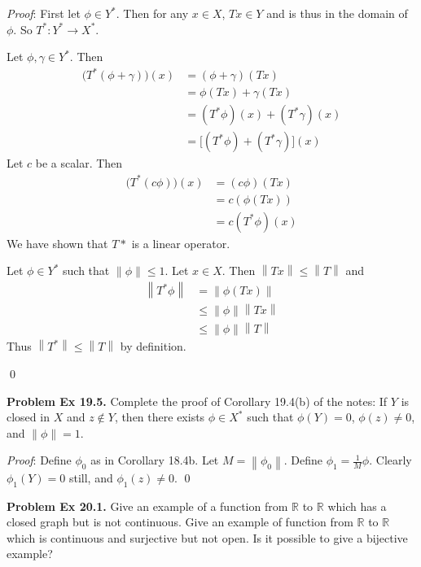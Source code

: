 \documentclass[12pt]{article}
\newcommand{\problem}[1]{\hspace{-4 ex} \large \textbf{Problem #1} }
\newcommand{\norm}[1]{\left\lVert#1\right\rVert}
\renewenvironment{proof}{\hspace{-4 ex} \emph{Proof}:}{\qed}
\newcommand{\RR}{\mathbb{R}}
\begin{document}
	\begin{proof}
		First let $\phi \in Y^*$. Then for any $x \in X$, $Tx \in Y$ and is thus in the domain of $\phi$. So $T^*: Y^* \to X^*$. \bigbreak
		
		Let $\phi, \gamma \in Y^*$. Then 
		\begin{align*}
			\big(T^*(\phi + \gamma) \big)(x) & = (\phi + \gamma)(Tx) \\
			& = \phi(Tx) + \gamma(Tx) \\
			& = (T^*\phi)(x) + (T^*\gamma)(x) \\
			& = \big[(T^*\phi)+ (T^*\gamma)\big](x)
		\end{align*}
		Let $c$ be a scalar. Then
		\begin{align*}
			\big( T^*(c\phi) \big)(x) &= (c\phi)(Tx) \\
			& = c (\phi(Tx)) \\
			& = c(T^* \phi)(x)
		\end{align*}
		We have shown that $T*$ is a linear operator. \bigbreak
		
		Let $\phi \in Y^*$ such that $\norm{\phi} \leq 1$. Let $x \in X$. Then $\norm{Tx} \leq \norm{T}$ and
		\begin{align*}
			\norm{T^* \phi} & = \norm{\phi(Tx)} \\
			& \leq \norm{\phi} \norm{Tx} \\
			& \leq \norm{\phi}\norm{T}
		\end{align*}
		Thus $\norm{T^*} \leq \norm{T}$ by definition.
		
	\end{proof}

\bigbreak
\problem{Ex 19.5.} Complete the proof of Corollary 19.4(b) of the notes: If $Y$ is closed in $X$ and $z\notin Y$, then there exists $\phi\in X^*$ such that $\phi(Y)=0$, $\phi(z)\neq0$, and $\norm{\phi}=1$. \bigbreak

	\begin{proof}
		Define $\phi_0$ as in Corollary 18.4b. Let $M = \norm{\phi_0}$. Define $\phi_1 = \tfrac{1}{M}\phi$. Clearly $\phi_1(Y)=0$ still, and $\phi_1(z)\neq 0$. 
	\end{proof}

\bigbreak
\problem{Ex 20.1.} Give an example of a function from $\RR$ to $\RR$ which has a closed graph but is not continuous. Give an example of function from $\RR$ to $\RR$ which is continuous and surjective but not open. Is it possible to give a bijective example? \bigbreak
\end{document}
